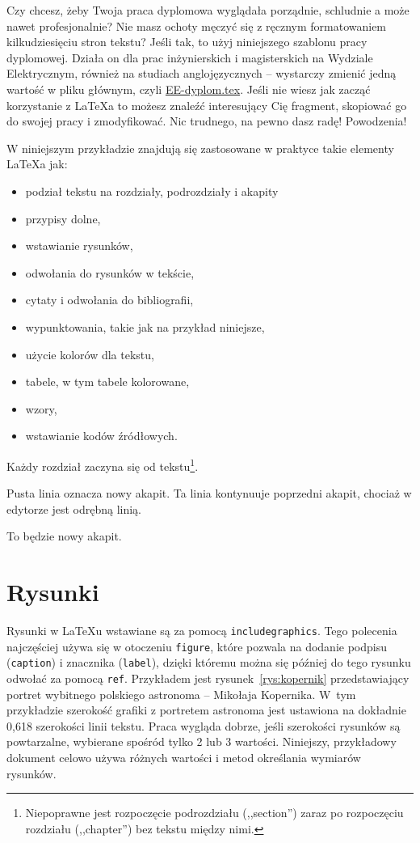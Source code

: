 Czy chcesz, żeby Twoja praca dyplomowa wyglądała porządnie, schludnie a może nawet profesjonalnie? Nie masz ochoty męczyć się z ręcznym formatowaniem kilkudziesięciu stron tekstu? Jeśli tak, to użyj niniejszego szablonu pracy dyplomowej. Działa on dla prac inżynierskich i magisterskich na Wydziale Elektrycznym, również na studiach anglojęzycznych -- wystarczy zmienić jedną wartość w pliku głównym, czyli \href{./EE-dyplom.tex}{EE-dyplom.tex}. Jeśli nie wiesz jak zacząć korzystanie z \LaTeX{a} to możesz znaleźć interesujący Cię fragment, skopiować go do swojej pracy i zmodyfikować. Nic trudnego, na pewno dasz radę! Powodzenia!

W niniejszym przykładzie znajdują się zastosowane w praktyce takie elementy \LaTeX{a} jak:
\begin{itemize}
    \item podział tekstu na rozdziały, podrozdziały i akapity
    \item przypisy dolne,
    \item wstawianie rysunków,
    \item odwołania do rysunków w tekście,
    \item cytaty i odwołania do bibliografii,
    \item wypunktowania, takie jak na przykład niniejsze,
    \item użycie kolorów dla tekstu,
    \item tabele, w tym tabele kolorowane, %
    \item wzory, %
    \item wstawianie kodów źródłowych.
\end{itemize}

Każdy rozdział zaczyna się od tekstu\footnote{Niepoprawne jest rozpoczęcie podrozdziału (,,section'') zaraz po rozpoczęciu rozdziału (,,chapter'') bez tekstu między nimi.}.

Pusta linia oznacza nowy akapit.
Ta linia kontynuuje poprzedni akapit, chociaż w edytorze jest odrębną linią.

To będzie nowy akapit.

\section{Rysunki}
Rysunki w \LaTeX{u} wstawiane są za pomocą \texttt{includegraphics}. Tego polecenia najczęściej używa się w otoczeniu \texttt{figure}, które pozwala na dodanie podpisu (\texttt{caption}) i znacznika (\texttt{label}), dzięki któremu można się później do tego rysunku odwołać za pomocą \texttt{ref}. Przykładem jest rysunek~\ref{rys:kopernik} przedstawiający portret wybitnego polskiego astronoma -- Mikołaja Kopernika. W~tym przykładzie szerokość grafiki z portretem astronoma jest ustawiona na dokładnie 0,618 szerokości linii tekstu. Praca wygląda dobrze, jeśli szerokości rysunków są powtarzalne, wybierane spośród tylko 2 lub 3 wartości. Niniejszy, przykładowy dokument celowo używa różnych wartości i metod określania wymiarów rysunków.

